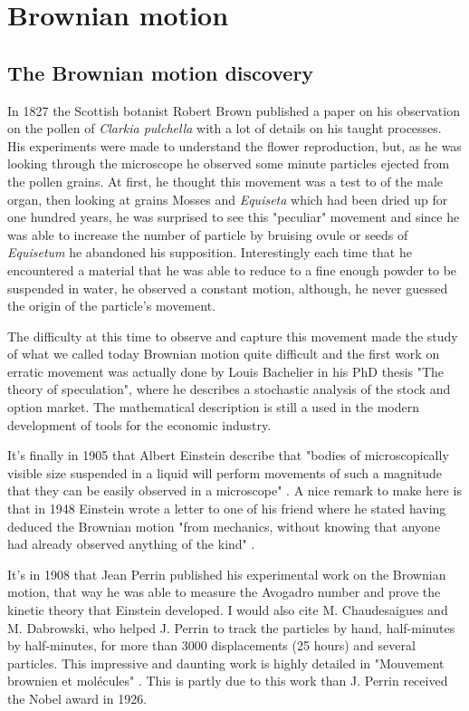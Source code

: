 \section{Brownian motion}
	\label{sec:chapter1}
	
\subsection{The Brownian motion discovery}


	
In 1827 the Scottish botanist Robert Brown published a paper \cite{robert_xxvii_1828} on his observation on the pollen of \textit{Clarkia pulchella} with a lot of details on his taught processes. His experiments were made to understand the flower reproduction, but, as he was looking through the microscope he observed some minute particles ejected from the pollen grains. At first, he thought this movement was a test to of the male organ, then looking at grains Mosses and \textit{Equiseta} which had been dried up for one hundred years, he was surprised to see this "peculiar" movement and since he was able to increase the number of particle by bruising ovule or seeds of \textit{Equisetum} he abandoned his supposition. Interestingly each time that he encountered a material that he was able to reduce to a fine enough powder to be suspended in water, he observed a constant motion, although, he never guessed the origin of the particle's movement.

The difficulty at this time to observe and capture this movement made the study of what we called today Brownian motion quite difficult and the first work on erratic movement was actually done by Louis Bachelier in his PhD thesis "The theory of speculation", where he describes a stochastic analysis of the stock and option market. The mathematical description is still a used in the modern development of tools for the economic industry. 

It's finally in 1905 that Albert Einstein describe that "bodies of microscopically visible size suspended in a liquid will perform movements of such a magnitude that they can be easily observed in a microscope" \cite{einstein_uber_1905}. A nice remark to make here is that in 1948 Einstein wrote a letter to one of his friend where he stated having deduced the Brownian motion "from mechanics, without knowing that anyone had already observed anything of the kind" \cite{peter_brownian_nodate}.

It's in 1908 that Jean Perrin published his experimental work on the Brownian motion, that way he was able to measure the Avogadro number and prove the kinetic theory that Einstein developed. I would also cite M. Chaudesaigues and M. Dabrowski, who helped J. Perrin to track the particles by hand, half-minutes by half-minutes, for more than 3000 displacements (25 hours) and several particles. This impressive and daunting work is highly detailed in "Mouvement brownien et molécules" \cite{perrin_mouvement_1910}. This is partly due to this work than J. Perrin received the Nobel award in 1926.

